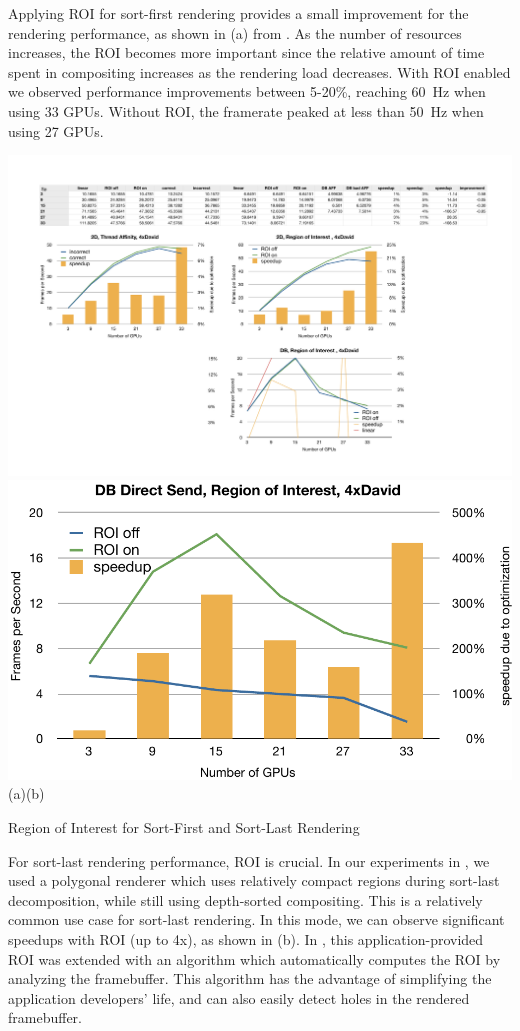 Applying ROI for sort-first rendering provides a small improvement for the
rendering performance, as shown in (a) from \cite{EBAHMP:12}. As the
number of resources increases, the ROI becomes more important since the
relative amount of time spent in compositing increases as the rendering load
decreases. With ROI enabled we observed performance improvements between
5-20\%, reaching 60~Hz when using 33 GPUs. Without ROI, the framerate peaked at
less than 50~Hz when using 27 GPUs.

\begin{benchmark}[t]\center
    \includegraphics[width=.48\textwidth]{results/roiSF}\hfil
    \includegraphics[width=.48\textwidth]{results/roiSL}\\{\small(a)\hspace{.5\textwidth}(b)}\\
 {\caption{\label{rROI}Region of Interest for Sort-First and Sort-Last Rendering}}
\end{benchmark}

For sort-last rendering performance, ROI is crucial. In our experiments in
\cite{EBAHMP:12}, we used a polygonal renderer which uses relatively compact
regions during sort-last decomposition, while still using depth-sorted
compositing. This is a relatively common use case for sort-last rendering. In
this mode, we can observe significant speedups with ROI (up to 4x), as shown in
(b). In \cite{MEP:10}, this application-provided ROI was extended with an algorithm
which automatically computes the ROI by analyzing the framebuffer. This
algorithm has the advantage of simplifying the application developers' life,
and can also easily detect holes in the rendered framebuffer.


